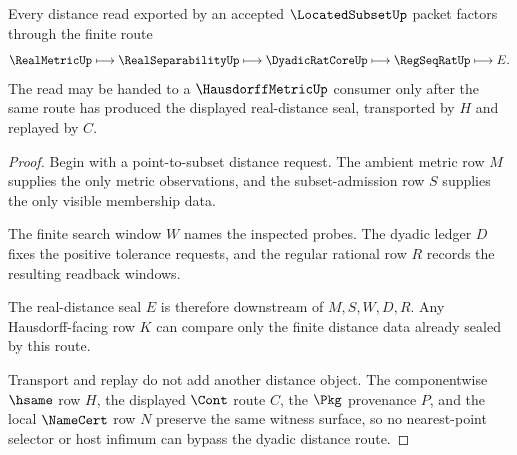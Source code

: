 \begin{theorem}
\label{thm:located-subset-dyadic-distance-witness}
Every distance read exported by an accepted $\LocatedSubsetUp$ packet factors through the finite route
$$
\RealMetricUp \longmapsto \RealSeparabilityUp \longmapsto \DyadicRatCoreUp \longmapsto \RegSeqRatUp \longmapsto E .
$$
The read may be handed to a $\HausdorffMetricUp$ consumer only after the same route has produced the displayed real-distance seal, transported by $H$ and replayed by $C$.
\end{theorem}
\begin{proof}
Begin with a point-to-subset distance request. The ambient metric row $M$ supplies the only metric observations, and the subset-admission row $S$ supplies the only visible membership data.

The finite search window $W$ names the inspected probes. The dyadic ledger $D$ fixes the positive tolerance requests, and the regular rational row $R$ records the resulting readback windows.

The real-distance seal $E$ is therefore downstream of $M,S,W,D,R$. Any Hausdorff-facing row $K$ can compare only the finite distance data already sealed by this route.

Transport and replay do not add another distance object. The componentwise $\hsame$ row $H$, the displayed $\Cont$ route $C$, the $\Pkg$ provenance $P$, and the local $\NameCert$ row $N$ preserve the same witness surface, so no nearest-point selector or host infimum can bypass the dyadic distance route.
\end{proof}




